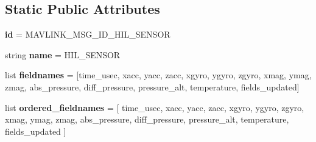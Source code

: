 \subsection*{Static Public Attributes}
\begin{DoxyCompactItemize}
\item 
\mbox{\label{classpymavlink_1_1dialects_1_1v10_1_1MAVLink__hil__sensor__message_a45013535a6ec7ec63f71bbb39262d5b7}} 
{\bfseries id} = M\+A\+V\+L\+I\+N\+K\+\_\+\+M\+S\+G\+\_\+\+I\+D\+\_\+\+H\+I\+L\+\_\+\+S\+E\+N\+S\+OR
\item 
\mbox{\label{classpymavlink_1_1dialects_1_1v10_1_1MAVLink__hil__sensor__message_a60e2c5dd605c1998f9ca4cab331ae5e4}} 
string {\bfseries name} = \textquotesingle{}H\+I\+L\+\_\+\+S\+E\+N\+S\+OR\textquotesingle{}
\item 
\mbox{\label{classpymavlink_1_1dialects_1_1v10_1_1MAVLink__hil__sensor__message_a927bb28fe057cf790edc1c7e753de4f1}} 
list {\bfseries fieldnames} = \mbox{[}\textquotesingle{}time\+\_\+usec\textquotesingle{}, \textquotesingle{}xacc\textquotesingle{}, \textquotesingle{}yacc\textquotesingle{}, \textquotesingle{}zacc\textquotesingle{}, \textquotesingle{}xgyro\textquotesingle{}, \textquotesingle{}ygyro\textquotesingle{}, \textquotesingle{}zgyro\textquotesingle{}, \textquotesingle{}xmag\textquotesingle{}, \textquotesingle{}ymag\textquotesingle{}, \textquotesingle{}zmag\textquotesingle{}, \textquotesingle{}abs\+\_\+pressure\textquotesingle{}, \textquotesingle{}diff\+\_\+pressure\textquotesingle{}, \textquotesingle{}pressure\+\_\+alt\textquotesingle{}, \textquotesingle{}temperature\textquotesingle{}, \textquotesingle{}fields\+\_\+updated\textquotesingle{}\mbox{]}
\item 
\mbox{\label{classpymavlink_1_1dialects_1_1v10_1_1MAVLink__hil__sensor__message_a37583bb8b03094bc3231a3543a9f1bd1}} 
list {\bfseries ordered\+\_\+fieldnames} = \mbox{[} \textquotesingle{}time\+\_\+usec\textquotesingle{}, \textquotesingle{}xacc\textquotesingle{}, \textquotesingle{}yacc\textquotesingle{}, \textquotesingle{}zacc\textquotesingle{}, \textquotesingle{}xgyro\textquotesingle{}, \textquotesingle{}ygyro\textquotesingle{}, \textquotesingle{}zgyro\textquotesingle{}, \textquotesingle{}xmag\textquotesingle{}, \textquotesingle{}ymag\textquotesingle{}, \textquotesingle{}zmag\textquotesingle{}, \textquotesingle{}abs\+\_\+pressure\textquotesingle{}, \textquotesingle{}diff\+\_\+pressure\textquotesingle{}, \textquotesingle{}pressure\+\_\+alt\textquotesingle{}, \textquotesingle{}temperature\textquotesingle{}, \textquotesingle{}fields\+\_\+updated\textquotesingle{} \mbox{]}

\end{DoxyCompactItemize}
